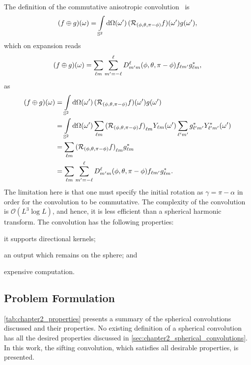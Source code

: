 The definition of the commutative anisotropic convolution~\autocite{Sadeghi2012,Khalid2012} is
%
\begin{equation}
	\pixel{(f \oplus g)}
	= \integrateSphere{\omega'} \pixel[']{(\rotation{(\phi,\theta,\pi-\phi)}f)} \pixel[']{g},
\end{equation}
%
which on expansion reads
%
\begin{equation}
	\pixel{(f \oplus g)}
	= \harmonicSum \sum\limits_{m'=-\ell}^{\ell} \wigner{\ell}{m'}{m}(\phi,\theta,\pi-\phi) f_{\ell m'} \conj{\harmonic{g}},
\end{equation}
%
as
%
\begin{align}
	\pixel{(f \oplus g)}
	 & = \integrateSphere{\omega'} \pixel[']{(\rotation{(\phi,\theta,\pi-\phi)}f)} \pixel[']{g} \nonumber{}                                                                                                  \\
	 & = \integrateSphere{\omega'} \harmonicSum \harmonic{(\rotation{(\phi,\theta,\pi-\phi)}f)} \pixel[']{\harmonic{Y}} \harmonicSum['] \conj{\harmonic[']{g}} \pixel[']{\conj{\harmonic[']{Y}}} \nonumber{} \\
	 & = \harmonicSum \harmonic{(\rotation{(\phi,\theta,\pi-\phi)}f)} \conj{\harmonic{g}} \nonumber{}                                                                                                        \\
	 & = \harmonicSum \sum\limits_{m'=-\ell}^{\ell} \wigner{\ell}{m'}{m}(\phi,\theta,\pi-\phi) f_{\ell m'} \conj{\harmonic{g}}.
\end{align}
%
The limitation here is that one must specify the initial rotation as \({\gamma=\pi-\alpha}\) in order for the convolution to be commutative.
The complexity of the convolution is \(\mathcal{O}(L^{3}\log{L})\), and hence, it is less efficient than a spherical harmonic transform.
The convolution has the following properties:
%
\begin{inparaenum}[(i)]
	\item it supports directional kernels;
	\item an output which remains on the sphere; and
	\item expensive computation.
\end{inparaenum}

\subsection{Problem Formulation}

\cref{tab:chapter2_properties} presents a summary of the spherical convolutions discussed and their properties.
No existing definition of a spherical convolution has all the desired properties discussed in \cref{sec:chapter2_spherical_convolutions}.
In this work, the sifting convolution, which satisfies all desirable properties, is presented.

